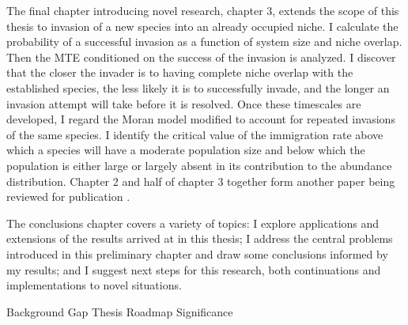 The final chapter introducing novel research, chapter 3, extends the scope of this thesis to invasion of a new species into an already occupied niche. %
I calculate the probability of a successful invasion as a function of system size and niche overlap. 
Then the MTE conditioned on the success of the invasion is analyzed. 
I discover that the closer the invader is to having complete niche overlap with the established species, the less likely it is to successfully invade, and the longer an invasion attempt will take before it is resolved. %
Once these timescales are developed, I regard the Moran model modified to account for repeated invasions of the same species. 
I identify the critical value of the immigration rate above which a species will have a moderate population size and below which the population is either large or largely absent in its contribution to the abundance distribution. %
Chapter 2 and half of chapter 3 together form another paper being reviewed for publication \cite{Badali2018}. %

The conclusions chapter covers a variety of topics: I explore applications and extensions of the results arrived at in this thesis; I address the central problems introduced in this preliminary chapter and draw some conclusions informed by my results; and I suggest next steps for this research, both continuations and implementations to novel situations. 



\iffalse

Background
Gap
Thesis
Roadmap
Significance

